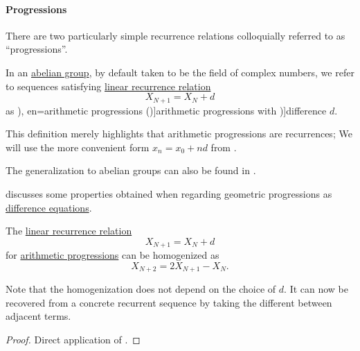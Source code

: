 \paragraph{Progressions}\hfill

There are two particularly simple recurrence relations colloquially referred to as \enquote{progressions}.

\begin{definition}\label{def:arithmetic_progression}\mimprovised
  In an \hyperref[def:abelian_group]{abelian group}, by default taken to be the field of complex numbers, we refer to sequences satisfying \hyperref[def:linear_recurrence]{linear recurrence relation}
  \begin{equation}\label{eq:def:arithmetic_progression/recurrence}
    X_{N+1} = X_N + d
  \end{equation}
  as \term[ru=арифметические прогрессии (\cite[143]{АлександровМаркушевичХинчинИПр1952ЭнциклопедияТом3}), en=arithmetic progressions (\cite[def. 2.4.3]{Rosen2019DiscreteMathematics})]{arithmetic progressions} with \term[en=common difference (\cite[def. 2.4.3]{Rosen2019DiscreteMathematics})]{difference} \( d \).
\end{definition}
\begin{comments}
  \item This definition merely highlights that arithmetic progressions are recurrences; We will use the more convenient form \( x_n = x_0 + nd \) from .

  \item The generalization to abelian groups can also be found in .

  \item {} discusses some properties obtained when regarding geometric progressions as \hyperref[def:difference_equation]{difference equations}.
\end{comments}

\begin{proposition}\label{thm:arithmetic_progression_homogeneization}
  The \hyperref[def:linear_recurrence]{linear recurrence relation}
  \begin{equation*}
    X_{N+1} = X_N + d
  \end{equation*}
  for \hyperref[def:arithmetic_progression]{arithmetic progressions} can be homogenized as
  \begin{equation}\label{eq:thm:arithmetic_progression_homogeneization}
    X_{N+2} = 2 X_{N+1} - X_N.
  \end{equation}
\end{proposition}
\begin{comments}
  \item Note that the homogenization does not depend on the choice of \( d \). It can now be recovered from a concrete recurrent sequence by taking the different between adjacent terms.
\end{comments}
\begin{proof}
  Direct application of .
\end{proof}

